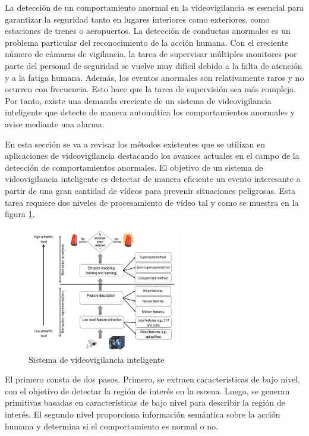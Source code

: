 La detección de un comportamiento anormal en la videovigilancia es esencial para garantizar la seguridad tanto en lugares interiores como exteriores, como estaciones de trenes o aeropuertos. La detección de conductas anormales es un problema particular del reconocimiento de la acción humana. Con el creciente número de cámaras de vigilancia, la tarea de supervisar múltiples monitores por parte del personal de seguridad se vuelve muy difícil debido a la falta de atención y a la fatiga humana. Además, los eventos anormales son relativamente raros y no ocurren con frecuencia. Esto hace que la tarea de supervisión sea más compleja. Por tanto, existe una demanda creciente de un sistema de videovigilancia inteligente que detecte de manera automática los comportamientos anormales y avise mediante una alarma.

En esta sección se va a revisar los métodos existentes \cite{BENMABROUK2018480} que se utilizan en aplicaciones de videovigilancia destacando los avances actuales en el campo de la detección de comportamientos anormales. El objetivo de un sistema de videovigilancia inteligente es detectar de manera eficiente un evento interesante a partir de una gran cantidad de vídeos para prevenir situaciones peligrosas. Esta tarea requiere dos niveles de procesamiento de vídeo tal y como se muestra en la figura \ref{fig:video-surveillance-system}.

\begin{figure}[ht]
\centering
\includegraphics[width=0.6\textwidth]{img/chapters/estado-del-arte/video-surveillance-system.png}
\caption{\label{fig:video-surveillance-system}Sistema de videovigilancia inteligente}
\end{figure}

El primero consta de dos pasos. Primero, se extraen características de bajo nivel, con el objetivo de detectar la región de interés en la escena. Luego, se generan primitivas basadas en características de bajo nivel para describir la región de interés. El segundo nivel proporciona información semántica sobre la acción humana y determina si el comportamiento es normal o no.

